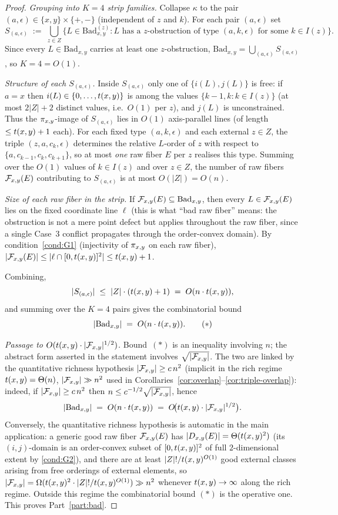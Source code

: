 \begin{proof}
\emph{Grouping into $K=4$ strip families.} Collapse $\kappa$ to the pair
$(a,\epsilon)\in\{x,y\}\times\{+,-\}$ (independent of $z$ and $k$). For
each pair $(a,\epsilon)$ set
\[
S_{(a,\epsilon)}\;:=\;\bigcup_{z\in Z}\bigl\{L\in\mathrm{Bad}_{x,y}^{(z)}
:L\text{ has a $z$-obstruction of type }(a,k,\epsilon)
\text{ for some }k\in I(z)\bigr\}.
\]
Since every $L\in\mathrm{Bad}_{x,y}$ carries at least one $z$-obstruction,
$\mathrm{Bad}_{x,y}=\bigcup_{(a,\epsilon)}S_{(a,\epsilon)}$, so $K=4=O(1)$.

\emph{Structure of each $S_{(a,\epsilon)}$.} Inside $S_{(a,\epsilon)}$
only one of $\{i(L),j(L)\}$ is free: if $a=x$ then $i(L)\in\{0,\dots,t(x,y)\}$
is among the values $\{k-1,k:k\in I(z)\}$ (at most $2|Z|+2$ distinct
values, i.e.\ $O(1)$ per $z$), and $j(L)$ is unconstrained. Thus the
$\pi_{x,y}$-image of $S_{(a,\epsilon)}$ lies in $O(1)$ axis-parallel lines
(of length $\le t(x,y)+1$ each). For each fixed type $(a,k,\epsilon)$ and each
external $z\in Z$, the triple $(z,a,c_k,\epsilon)$ determines the relative
$L$-order of $z$ with respect to $\{a,c_{k-1},c_k,c_{k+1}\}$, so at most
\emph{one} raw fiber $E$ per $z$ realises this type. Summing over the
$O(1)$ values of $k\in I(z)$ and over $z\in Z$, the number of raw fibers
$\mathcal{F}_{x,y}(E)$ contributing to $S_{(a,\epsilon)}$ is at most $O(|Z|)=O(n)$.

\emph{Size of each raw fiber in the strip.} If $\mathcal{F}_{x,y}(E)\subseteq
\mathrm{Bad}_{x,y}$, then every $L\in\mathcal{F}_{x,y}(E)$ lies on the fixed coordinate
line $\ell$ (this is what ``bad raw fiber'' means: the obstruction is not a
mere point defect but applies throughout the raw fiber, since a single
Case~3 conflict propagates through the order-convex domain). By
condition~\ref{cond:G1} (injectivity of $\pi_{x,y}$ on each raw fiber),
$|\mathcal{F}_{x,y}(E)|\le|\ell\cap[0,t(x,y)]^2|\le t(x,y)+1$.

Combining,
\[
|S_{(a,\epsilon)}|\;\le\;|Z|\cdot(t(x,y)+1)\;=\;O(n\cdot t(x,y)),
\]
and summing over the $K=4$ pairs gives the combinatorial bound
\[
|\mathrm{Bad}_{x,y}|\;=\;O(n\cdot t(x,y)).\tag{$\ast$}
\]

\emph{Passage to $O(t(x,y)\cdot|\mathcal{F}_{x,y}|^{1/2})$.}
Bound~$(\ast)$ is an inequality involving $n$; the abstract form asserted
in the statement involves $\sqrt{|\mathcal{F}_{x,y}|}$. The two are linked by the
quantitative richness hypothesis $|\mathcal{F}_{x,y}|\ge c\,n^{2}$ (implicit in the rich
regime $t(x,y)=\Theta(n)$, $|\mathcal{F}_{x,y}|\gg n^{2}$ used in
Corollaries~\ref{cor:overlap}--\ref{cor:triple-overlap}): indeed, if
$|\mathcal{F}_{x,y}|\ge c\,n^{2}$ then $n\le c^{-1/2}\sqrt{|\mathcal{F}_{x,y}|}$, hence
\[
|\mathrm{Bad}_{x,y}|\;=\;O(n\cdot t(x,y))\;=\;
O\!\bigl(t(x,y)\cdot|\mathcal{F}_{x,y}|^{1/2}\bigr).
\]
Conversely, the quantitative richness hypothesis is automatic in the main
application: a generic good raw fiber $\mathcal{F}_{x,y}(E)$ has $|D_{x,y}(E)|=\Theta(t(x,y)^{2})$
(its $(i,j)$-domain is an order-convex subset of $[0,t(x,y)]^2$ of full
$2$-dimensional extent by \ref{cond:G2}), and there are at least $|Z|!/t(x,y)^{O(1)}$
good external classes arising from free orderings of external elements,
so $|\mathcal{F}_{x,y}|=\Omega(t(x,y)^{2}\cdot|Z|!/t(x,y)^{O(1)})\gg n^{2}$ whenever
$t(x,y)\to\infty$ along the rich regime. Outside this regime the combinatorial
bound $(\ast)$ is the operative one. This proves Part~\ref{part:bad}.
\end{proof}

